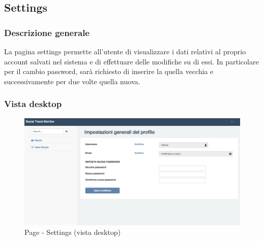 \clearpage

	\subsection{Settings} %
	\label{sub:settings}
		\subsubsection{Descrizione generale} %
		La pagina settings permette all'utente di visualizzare i dati relativi al proprio account salvati nel sistema e di effettuare delle modifiche su di essi. In particolare per il cambio password, sarà richiesto di inserire la quella vecchia e successivamente per due volte quella nuova.

		\subsubsection{Vista desktop} %
		\begin{figure}[!h]
			\centering
			\centerline{\includegraphics[scale=0.4]{./images/mockup/settings_vd.pdf}}
			\caption{Page - Settings (vista desktop)}
		\end{figure}
\clearpage
